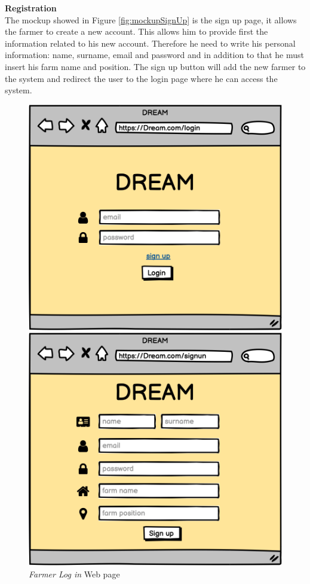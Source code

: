 \textbf{Registration} \\
The mockup showed in Figure \ref{fig:mockupSignUp} is the sign up page, it allows the farmer to create a new account. This allows him to provide first the information related to his new account. 
Therefore he need to write his personal information: name, surname, email and password and in addition to that he must insert his farm name and position.
The sign up button will add the new farmer to the system and redirect the user to the login page where he can access the system.
\begin{figure}[H]
    \begin{minipage}{0.4\textwidth}
        \centering
        \includegraphics[width=1\textwidth]{images/mockups/FLogIn.png}
        \caption{\emph{Farmer Log in} Web page}
        \label{fig:mockupLogin}
    \end{minipage}\hfill
    \begin{minipage}{0.39\textwidth}
        \centering
        \includegraphics[width=1\textwidth]{images/mockups/FSignUp.png}

\end{minipage}
\end{figure}
